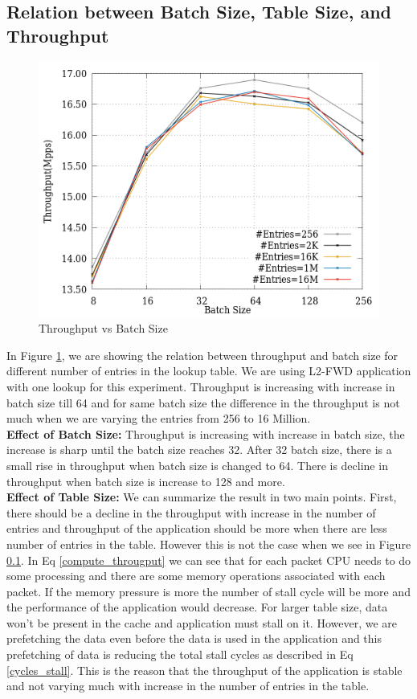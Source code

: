 \subsection{Relation between Batch Size, Table Size, and Throughput}
\label{batchvstable}
\begin{figure}[ht]
\includegraphics[width = \linewidth]{Figures/TableSizeVsbatchSize.png}
\caption{Throughput vs Batch Size}
\label{tablesize}
\end{figure}
In Figure \ref{tablesize}, we are showing the relation between throughput and batch size for different number of entries in the lookup table. We are using L2-FWD application with one lookup for this experiment. Throughput is increasing with increase in batch size till 64 and for same batch size the difference in the throughput is not much when we are varying the entries from 256 to 16 Million.
\\
\textbf{Effect of Batch Size:} Throughput is increasing with increase in batch size, the increase is sharp until the batch size reaches 32. After 32 batch size, there is a small rise in throughput when batch size is changed to 64. There is decline in throughput when batch size is increase to 128 and more. 
\\
\textbf{Effect of Table Size:} We can summarize the result in two main points. First, there should be a decline in the throughput with increase in the number of entries and throughput of the application should be more when there are less number of entries in the table. However this is not the case when we see in Figure \ref{batchvstable}. In Eq \ref{compute_througput} we can see that for each packet CPU needs to do some processing and there are some memory operations associated with each packet. If the memory pressure is more the number of stall cycle will be more and the performance of the application would decrease. For larger table size, data won't be present in the cache and application must stall on it. However, we are prefetching the data even before the data is used in the application and this prefetching of data is reducing the total stall cycles as described in Eq \ref{cycles_stall}. This is the reason that the throughput of the application is stable and not varying much with increase in the number of entries in the table. 

